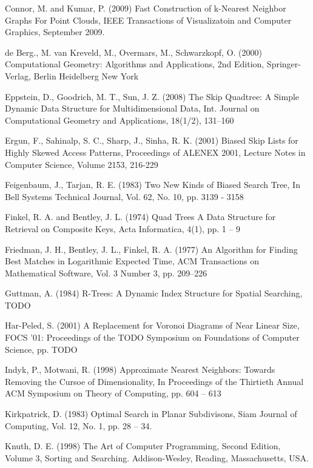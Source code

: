 \documentclass[mcs]{scsthesis}
\begin{document}
\begin{thebibliography}{5}
Connor, M. and Kumar, P. (2009) Fast Construction of k-Nearest Neighbor Graphs
For Point Clouds, IEEE Transactions of Visualizatoin and Computer Graphics,
September 2009.

de Berg., M. van Kreveld, M., Overmars, M., Schwarzkopf, O. (2000)
Computational Geometry: Algorithms and Applications, 2nd Edition, Springer-Verlag,
Berlin Heidelberg New York

Eppstein, D., Goodrich, M. T., Sun, J. Z. (2008) The Skip Quadtree: A Simple
Dynamic Data Structure for Multidimensional Data, Int. Journal on Computational
Geometry and Applications, 18(1/2), 131--160 

Ergun, F., Sahinalp, S. C., Sharp, J., Sinha, R. K. (2001) Biased Skip Lists
for Highly Skewed Access Patterns, Proceedings of ALENEX 2001, Lecture Notes in
Computer Science, Volume 2153, 216-229 

Feigenbaum, J., Tarjan, R. E. (1983) Two New Kinds of Biased Search Tree,
In Bell Systems Technical Journal, Vol. 62, No. 10, pp. 3139 - 3158

Finkel, R. A. and Bentley, J. L. (1974) Quad Trees A Data Structure for
Retrieval on Composite Keys, Acta Informatica, 4(1), pp. 1 – 9 

Friedman, J. H., Bentley, J. L., Finkel, R. A. (1977) An Algorithm for Finding
Best Matches in Logarithmic Expected Time, ACM Transactions on Mathematical
Software, Vol. 3 Number 3, pp. 209--226

Guttman, A. (1984) R-Trees: A Dynamic Index Structure for Spatial Searching,
TODO 

Har-Peled, S. (2001) A Replacement for Voronoi Diagrams of Near Linear Size, 
FOCS '01: Proceedings of the TODO Symposium on Foundations of Computer Science, 
pp. TODO

Indyk, P., Motwani, R. (1998) Approximate Nearest Neighbors: Towards Removing
the Cursoe of Dimensionality, In Proceedings of the Thirtieth Annual ACM
Symposium on Theory of Computing, pp. 604 -- 613 

Kirkpatrick, D. (1983) Optimal Search in Planar Subdivisons,
Siam Journal of Computing, Vol. 12, No. 1, pp. 28 -- 34.

Knuth, D. E. (1998) The Art of Computer Programming, Second Edition,
Volume 3, Sorting and Searching.  Addison-Wesley, Reading, Massachusetts, USA.


\end{thebibliography}
\end{document}
